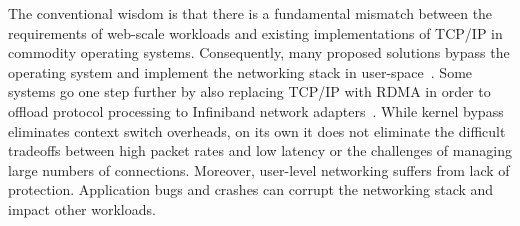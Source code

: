 
The conventional wisdom is that there is a fundamental mismatch
between the requirements of web-scale workloads and existing
implementations of TCP/IP in commodity operating
systems. Consequently, many proposed solutions bypass the operating
system and implement the networking stack in
user-space~\cite{jeong2014mtcp,Kapoor:2012:CPL,openonload,marinos2013network,Thekkath:1993:INP}. Some
systems go one step further by also replacing TCP/IP with RDMA in
order to offload protocol processing to Infiniband network
adapters~\cite{DBLP:conf/sosp/OngaroRSOR11,Jose:2011:MDH,mitchell:rdma,dragojevic14farm}. While
kernel bypass eliminates context switch overheads, on its own it does
not eliminate the difficult tradeoffs between high packet rates and
low latency or the challenges of managing large numbers of
connections. Moreover, user-level networking suffers from lack of
protection. Application bugs and crashes can corrupt the networking
stack and impact other workloads.

